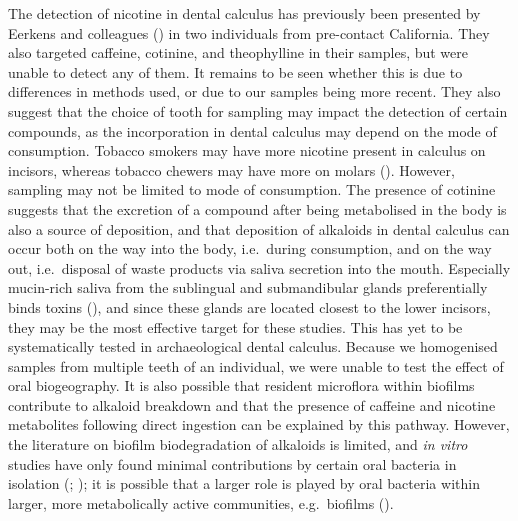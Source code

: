 \documentclass[
  11pt,
  leqno]{scrartcl}
\begin{document}
The detection of nicotine in dental calculus has previously been
presented by Eerkens and colleagues
() in two individuals from
pre-contact California. They also targeted caffeine, cotinine, and
theophylline in their samples, but were unable to detect any of them. It
remains to be seen whether this is due to differences in methods used,
or due to our samples being more recent. They also suggest that the
choice of tooth for sampling may impact the detection of certain
compounds, as the incorporation in dental calculus may depend on the
mode of consumption. Tobacco smokers may have more nicotine present in
calculus on incisors, whereas tobacco chewers may have more on molars
().
However, sampling may not be limited to mode of consumption. The
presence of cotinine suggests that the excretion of a compound after
being metabolised in the body is also a source of deposition, and that
deposition of alkaloids in dental calculus can occur both on the way
into the body, i.e.~during consumption, and on the way out,
i.e.~disposal of waste products via saliva secretion into the mouth.
Especially mucin-rich saliva from the sublingual and submandibular
glands preferentially binds toxins
(), and since
these glands are located closest to the lower incisors, they may be the
most effective target for these studies. This has yet to be
systematically tested in archaeological dental calculus. Because we
homogenised samples from multiple teeth of an individual, we were unable
to test the effect of oral biogeography. It is also possible that
resident microflora within biofilms contribute to alkaloid breakdown and
that the presence of caffeine and nicotine metabolites following direct
ingestion can be explained by this pathway. However, the literature on
biofilm biodegradation of alkaloids is limited, and \emph{in vitro}
studies have only found minimal contributions by certain oral bacteria
in isolation (;
); it is
possible that a larger role is played by oral bacteria within larger,
more metabolically active communities, e.g.~biofilms
().
\end{document}
